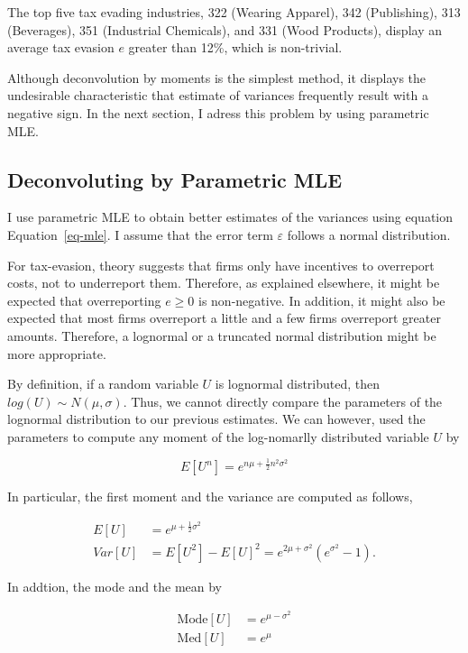 \documentclass[
  12pt]{article}
\theoremstyle{definition}
\theoremstyle{remark}
\begin{document}
The top five tax evading industries, 322 (Wearing Apparel), 342
(Publishing), 313 (Beverages), 351 (Industrial Chemicals), and 331 (Wood
Products), display an average tax evasion \(e\) greater than 12\%, which
is non-trivial.

Although deconvolution by moments is the simplest method, it displays
the undesirable characteristic that estimate of variances frequently
result with a negative sign. In the next section, I adress this problem
by using parametric MLE.

\subsection{Deconvoluting by Parametric
MLE}\label{deconvoluting-by-parametric-mle}

I use parametric MLE to obtain better estimates of the variances using
equation Equation~\ref{eq-mle}. I assume that the error term
\(\varepsilon\) follows a normal distribution.

For tax-evasion, theory suggests that firms only have incentives to
overreport costs, not to underreport them. Therefore, as explained
elsewhere, it might be expected that overreporting \(e\ge0\) is
non-negative. In addition, it might also be expected that most firms
overreport a little and a few firms overreport greater amounts.
Therefore, a lognormal or a truncated normal distribution might be more
appropriate.

By definition, if a random variable \(U\) is lognormal distributed, then
\(log(U)\sim N(\mu, \sigma)\). Thus, we cannot directly compare the
parameters of the lognormal distribution to our previous estimates. We
can however, used the parameters to compute any moment of the
log-nomarlly distributed variable \(U\) by

\[
E[U^n]=e^{n\mu+\frac{1}{2}n^2\sigma^2}
\]

In particular, the first moment and the variance are computed as
follows,

\[
\begin{aligned}  
E[U]&=e^{\mu+\frac{1}{2}\sigma^2}\\
Var[U]&=E[U^2]-E[U]^2=e^{2\mu+\sigma^2}(e^{\sigma^2}-1).
\end{aligned}
\]

In addtion, the mode and the mean by

\[
\begin{aligned}
  \text{Mode}[U]&=e^{\mu-\sigma^2} \\
  \text{Med}[U]&=e^{\mu}
\end{aligned}
\]
\end{document}
